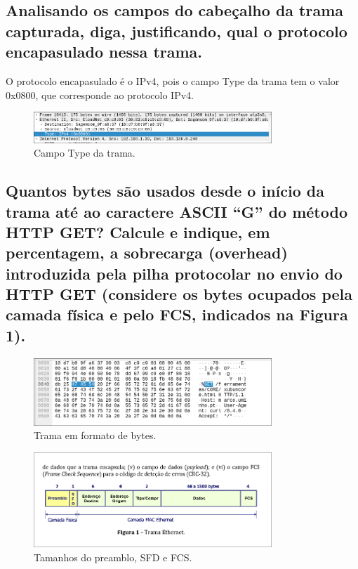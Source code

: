 \documentclass{article}
\begin{document}
\subsection{Analisando os campos do cabeçalho da trama capturada, diga, justificando, qual
o protocolo encapasulado nessa trama.}

O protocolo encapasulado é o IPv4, pois o campo Type da trama tem o valor 0x0800, que corresponde ao protocolo IPv4.

\begin{figure}
    \centering
    \includegraphics[width=0.8\textwidth]{type.png}
    \caption{\label{fig:type}Campo Type da trama.}
\end{figure}

\subsection{Quantos bytes são usados desde o início da trama até ao caractere ASCII “G” do
método HTTP GET? Calcule e indique, em percentagem, a sobrecarga (overhead)
introduzida pela pilha protocolar no envio do HTTP GET (considere os bytes
ocupados pela camada física e pelo FCS, indicados na Figura 1).}

\begin{figure}[h]
    \centering
    \includegraphics[width=0.8\textwidth]{byte.png}
    \caption{\label{fig:byte}Trama em formato de bytes.}
\end{figure}

\begin{figure}[h]
    \centering
    \includegraphics[width=0.8\textwidth]{fcs.png}
    \caption{\label{fig:fcs}Tamanhos do preamblo, SFD e FCS.}
\end{figure}
\end{document}
